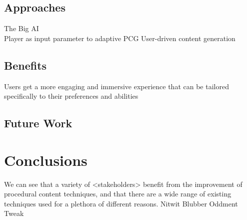 \documentclass{acm_proc_article-sp}
\begin{document}
\subsection{Approaches}
The Big AI\\
Player as input parameter to adaptive PCG
User-driven content generation

\subsection{Benefits}
Users get a more engaging and immersive experience that can be tailored specifically to their preferences and abilities
\subsection{Future Work}

\section{Conclusions}
We can see that a variety of <stakeholders> benefit from the improvement of procedural content techniques, and that there are a wide range of existing techniques used for a plethora of different reasons. Nitwit Blubber Oddment Tweak

\newpage


\balancecolumns
\end{document}
